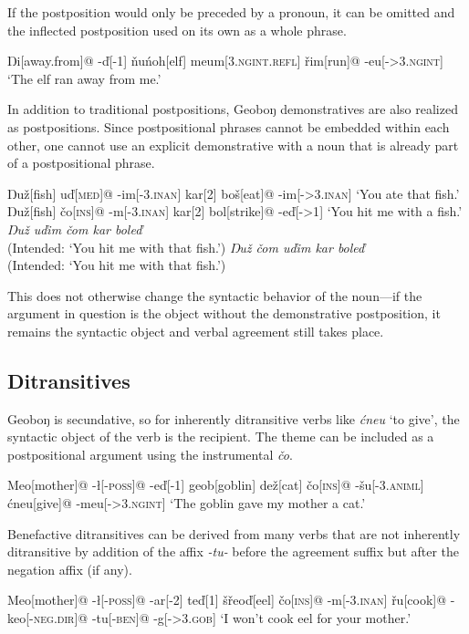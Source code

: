 \documentclass[10pt]{article}
\newcommand{\sk}{\textsc}
\newcommand{\vd}{ď}
\newcommand{\vc}{č}
\newcommand{\vz}{ž}
\newcommand{\vs}{š}
\newcommand{\vr}{ř}
\newcommand{\vn}{ň}
\newcommand{\Engma}{Ŋ}
\newcommand{\engma}{ŋ}
\begin{document}
If the postposition would only be preceded by a pronoun, it can be omitted and the inflected postposition used on its own as a whole phrase.

\ex 
\begingl 
\Engma i[away.from]@
-\vd[-1]
\vn u\'noh[elf]
meum[\sk{3.ngint.refl}]
\vr im[run]@
-eu[-\sk{>3.ngint}]
\glft `The elf ran away from me.'
\endgl
\xe

In addition to traditional postpositions, Geobo{\engma} demonstratives are also realized as postpositions. Since postpositional phrases cannot be embedded within each other, one cannot use an explicit demonstrative with a noun that is already part of a postpositional phrase.

\pex
\a
\begingl
\Engma u{\vz}[fish]
u\vd[\sk{med}]@
-im[-\sk{3.inan}]
kar[2]
bo\vs[eat]@
-im[-\sk{>3.inan}]
\glft `You ate that fish.'
\endgl
\a 
\begingl 
\Engma u\vz[fish]
\vc o[\sk{ins}]@
-m[-\sk{3.inan}]
kar[2]
bol[strike]@
-e\vd[-\sk{>1}]
\glft `You hit me with a fish.'
\endgl
\a \ljudge* \textit{\Engma u{\vz} u\vd im \vc om kar bole\vd} \\
(Intended: `You hit me with that fish.')
\a \ljudge* \textit{\Engma u{\vz} \vc om u\vd im kar bole\vd} \\
(Intended: `You hit me with that fish.')
\xe

This does not otherwise change the syntactic behavior of the noun---if the argument in question is the object without the demonstrative postposition, it remains the syntactic object and verbal agreement still takes place.

\subsection{Ditransitives}

Geobo{\engma} is secundative, so for inherently ditransitive verbs like \textit{\'cneu} `to give', the syntactic object of the verb is the recipient. The theme can be included as a postpositional argument using the instrumental \textit{\vc o}.

\ex
\begingl
Meo[mother]@
-\l[-\sk{poss}]@
-e{\vd}[-\sk{1}]
geob[goblin]
de{\vz}[cat]
\vc o[\sk{ins}]@
-\vs u[-\sk{3.animl}]
\'cneu[give]@
-meu[-\sk{>3.ngint}]
\glft `The goblin gave my mother a cat.'
\endgl
\xe

Benefactive ditransitives can be derived from many verbs that are not inherently ditransitive by addition of the affix \textit{-tu-} before the agreement suffix but after the negation affix (if any).

\ex
\begingl
Meo[mother]@
-\l[-\sk{poss}]@
-ar[-2]
te{\vd}[1]
\vs\vr eo{\vd}[eel]
\vc o[\sk{ins}]@
-m[-\sk{3.inan}] 
\vr u[cook]@
-keo[-\sk{neg.dir}]@
-tu[-\sk{ben}]@
-g[-\sk{>3.gob}]
\glft `I won't cook eel for your mother.'
\endgl
\xe
\end{document}
